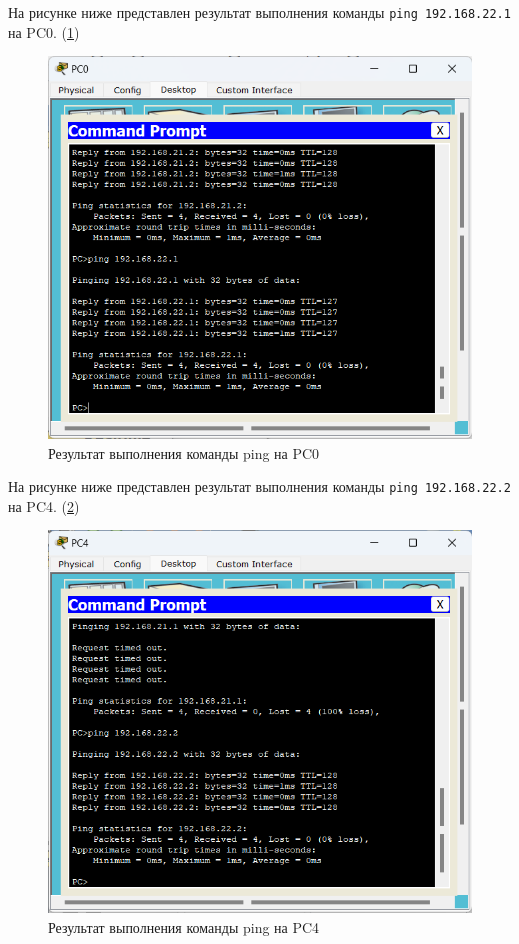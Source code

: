 \documentclass[14pt]{extarticle}
\begin{document}
На рисунке ниже представлен результат выполнения команды \texttt{ping 192.168.22.1} на PC0. (\ref{img:PC0Ping4})

\begin{figure}[H]
    \centering
    \includegraphics[width=1.0\linewidth]{PC0Ping4.png}
    \caption{Результат выполнения команды ping на PC0\label{img:PC0Ping4}}
\end{figure}

На рисунке ниже представлен результат выполнения команды \texttt{ping 192.168.22.2} на PC4. (\ref{img:PC4Ping5})

\begin{figure}[H]
    \centering
    \includegraphics[width=1.0\linewidth]{PC4Ping5.png}
    \caption{Результат выполнения команды ping на PC4\label{img:PC4Ping5}}
\end{figure}
\end{document}
